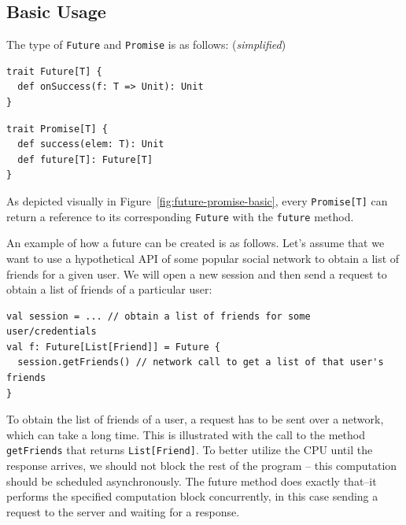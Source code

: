 \subsection{Basic Usage}

The type of \verb|Future| and \verb|Promise| is as follows: ({\em simplified})


\begin{minipage}[t]{0.5\linewidth}
\begin{verbatim}
trait Future[T] {
  def onSuccess(f: T => Unit): Unit
}
\end{verbatim}
\end{minipage}
\begin{minipage}[t]{0.5\linewidth}
\begin{verbatim}
trait Promise[T] {
  def success(elem: T): Unit
  def future[T]: Future[T]
}
\end{verbatim}
\end{minipage}

As depicted visually in Figure~\ref{fig:future-promise-basic}, every
\verb|Promise[T]| can return a reference to its corresponding \verb|Future| with
the \verb|future| method.

An example of how a future can be created is as follows. Let’s assume that we
want to use a hypothetical API of some popular social network to obtain a list
of friends for a given user. We will open a new session and then send a request
to obtain a list of friends of a particular user:

\begin{verbatim}
val session = ... // obtain a list of friends for some user/credentials
val f: Future[List[Friend]] = Future {
  session.getFriends() // network call to get a list of that user's friends
}
\end{verbatim}

To obtain the list of friends of a user, a request has to be sent over a
network, which can take a long time. This is illustrated with the call to the
method \verb|getFriends| that returns \verb|List[Friend]|. To better utilize the
CPU until the response arrives, we should not block the rest of the program --
this computation should be scheduled asynchronously. The future method does
exactly that--it performs the specified computation block concurrently, in this
case sending a request to the server and waiting for a response.

